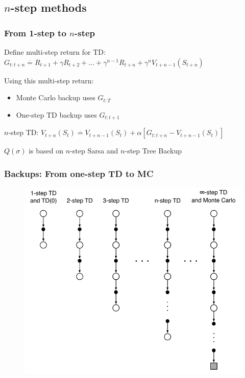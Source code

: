 \documentclass{beamer}
\begin{document}
\subsection{$n$-step methods}

\begin{frame}
  \frametitle{From 1-step to $n$-step}
  Define multi-step return for TD: $G_{t : t + n} \overset{\cdot}{=} R_{t + 1} +
    \gamma R_{t + 2} + \ldots + \gamma^{n - 1} R_{t + n} +
    \gamma^n V_{t + n - 1}(S_{t + n})$

  Using this multi-step return:
  \begin{itemize}
    \item Monte Carlo backup uses $G_{t : T}$
    \item One-step TD backup uses $G_{t : t + 1}$
  \end{itemize}

  $n$-step TD: $V_{t + n}(S_t) \overset{\cdot}{=} V_{t + n - 1}(S_t) +
    \alpha [G_{t : t + n} - V_{t + n - 1}(S_t)]$

  $Q(\sigma)$ is based on $n$-step Sarsa and $n$-step Tree Backup
\end{frame}

\begin{frame}
  \frametitle{Backups: From one-step TD to MC}
  \begin{figure}
    \centering
    \includegraphics[height=0.7 \textheight]{one-step-to-multi-step}
  \end{figure}
\end{frame}
\end{document}
